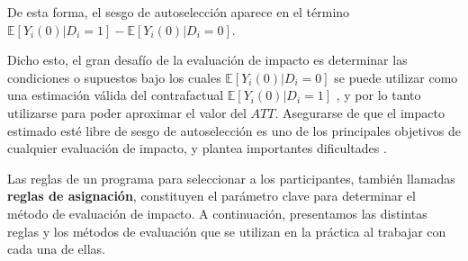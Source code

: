 \documentclass[../../main.tex]{subfiles}
\begin{document}
De esta forma, el sesgo de autoselección aparece en el término \(\mathbb{E} \left[Y_i(0)|D_i=1\right] - \mathbb{E} \left[Y_i(0)|D_i=0\right]\).

Dicho esto, el gran desafío de la evaluación de impacto es determinar las condiciones o supuestos bajo los cuales \(\mathbb{E} \left[Y_i(0)|D_i=0\right]\) se puede utilizar como una estimación válida del contrafactual \(\mathbb{E} \left[Y_i(0)|D_i=1\right]\) \cite{bernal}, y por lo tanto utilizarse para poder aproximar el valor del \(ATT\). Asegurarse de que el impacto estimado esté libre de sesgo de autoselección es uno de los principales objetivos de cualquier evaluación
de impacto, y plantea importantes dificultades \cite{gertler-2016}. 

\bigskip
Las reglas de un programa para seleccionar a los participantes, también llamadas \textbf{reglas de asignación}, constituyen el parámetro clave para determinar el método de evaluación de impacto. A continuación, presentamos las distintas reglas y los métodos de evaluación que se utilizan en la práctica al trabajar con cada una de ellas.
\end{document}

